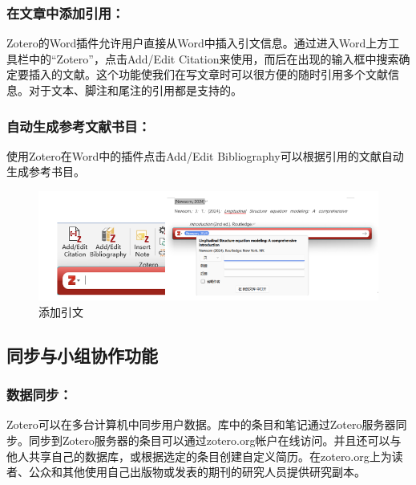\documentclass[]{ctexbook}
\theoremstyle{definition}
\theoremstyle{definition}
\theoremstyle{definition}
\theoremstyle{definition}
\theoremstyle{remark}
\begin{document}
\subsubsection{在文章中添加引用：}\label{ux5728ux6587ux7ae0ux4e2dux6dfbux52a0ux5f15ux7528}

Zotero的Word插件允许用户直接从Word中插入引文信息。通过进入Word上方工具栏中的``Zotero''，点击Add/Edit Citation来使用，而后在出现的输入框中搜索确定要插入的文献。这个功能使我们在写文章时可以很方便的随时引用多个文献信息。对于文本、脚注和尾注的引用都是支持的。

\subsubsection{自动生成参考文献书目：}\label{ux81eaux52a8ux751fux6210ux53c2ux8003ux6587ux732eux4e66ux76ee}

使用Zotero在Word中的插件点击Add/Edit Bibliography可以根据引用的文献自动生成参考书目。

\begin{figure}

{\centering \includegraphics[width=1\linewidth]{img/zotero/zotero_citation} 

}

\caption{添加引文}\label{fig:zotero-citation}
\end{figure}

\subsection{同步与小组协作功能}\label{ux540cux6b65ux4e0eux5c0fux7ec4ux534fux4f5cux529fux80fd}

\subsubsection{数据同步：}\label{ux6570ux636eux540cux6b65}

Zotero可以在多台计算机中同步用户数据。库中的条目和笔记通过Zotero服务器同步。同步到Zotero服务器的条目可以通过zotero.org帐户在线访问。并且还可以与他人共享自己的数据库，或根据选定的条目创建自定义简历。在zotero.org上为读者、公众和其他使用自己出版物或发表的期刊的研究人员提供研究副本。
\end{document}

